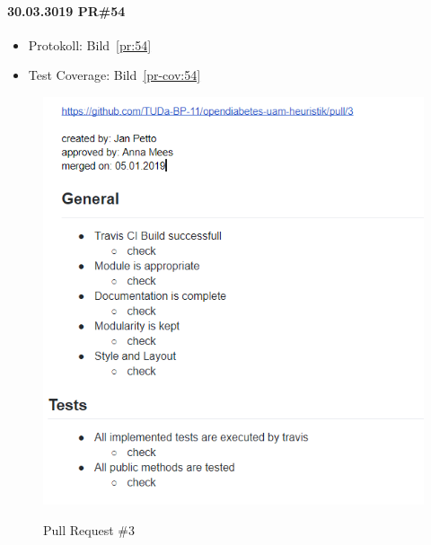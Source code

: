 \documentclass[accentcolor=tud0b,12pt,paper=a4]{tudreport}
\begin{document}
\paragraph{30.03.3019 PR\#54}
\begin{itemize}
\item Protokoll: Bild~\ref{pr:54}
\item Test Coverage: Bild~\ref{pr-cov:54}
\end{itemize}

\begin{figure}[h]
\centering
\caption{Pull Request \#3}
\includegraphics[width=\textwidth,height=\textheight,keepaspectratio]{pr-3}
\label{pr:3}
\end{figure}
\end{document}
